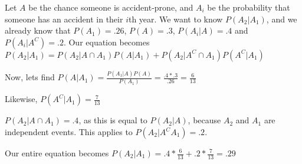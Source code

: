 \documentclass{article}
\begin{document}
\begin{solution}
Let $A$ be the chance someone is accident-prone, and $A_i$ be the probability that someone has an accident in their $i$th year. We want to know $P(A_2 \vert A_1)$, and we already know that $P(A_1) = .26$, $P(A)=.3$, $P(A_i \vert A) = .4$ and $P(A_i \vert A^C) = .2$. Our equation becomes $P(A_2 \vert A_1) = P(A_2 \vert A \cap A_1)P(A \vert A_1) + P(A_2 \vert A^C \cap A_1)P(A^C \vert A_1)$

Now, lets find $P(A \vert A_1) = \frac{P(A_1 \vert A)P(A)}{P(A_1)} = \frac{.4*.3}{.26} = \frac{6}{13}$

Likewise, $P(A^C \vert A_1) = \frac{7}{13}$

$P(A_2 \vert A \cap A_1) = .4$, as this is equal to $P(A_2 \vert A)$, because $A_2$ and $A_1$ are independent events. This applies to $P(A_2 \vert A^C A_1) = .2$.

Our entire equation becomes $P(A_2 \vert A_1) = .4*\frac{6}{13} + .2*\frac{7}{13} = .29$
\end{solution}
\end{document}
